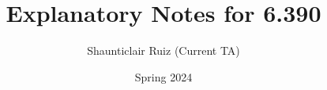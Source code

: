 \documentclass[10pt,oneside]{book}
\title{Explanatory Notes for 6.390}
\author{Shaunticlair Ruiz (Current TA)}
\date{Spring 2024}
\begin{document}
\maketitle

\setcounter{tocdepth}{2} %
\tableofcontents

% 
 
 
 


 
 
 


 
 
 


 

 







 
 

 
 
 


 


 \begin{appendices}
    
\end{appendices} 


%











% 
% 
%
\end{document}
